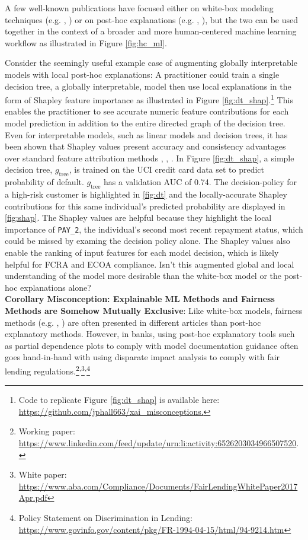 \documentclass[fleqn]{article}
\begin{document}
A few well-known publications have focused either on white-box modeling techniques (e.g. \cite{slim}, \cite{sbrl}) or on post-hoc explanations (e.g. \cite{lime}, \cite{shapley}), but the two can be used together in the context of a broader and more human-centered machine learning workflow as illustrated in Figure \ref{fig:hc_ml}. 

Consider the seemingly useful example case of augmenting globally interpretable models with local post-hoc explanations: A practitioner could train a single decision tree, a globally interpretable, model then use local explanations in the form of Shapley feature importance as illustrated in Figure \ref{fig:dt_shap}.\footnote{Code to replicate Figure \ref{fig:dt_shap} is available here: \url{https://github.com/jphall663/xai_misconceptions.}} This enables the practitioner to see accurate numeric feature contributions for each model prediction in addition to the entire directed graph of the decision tree. Even for interpretable models, such as linear models and decision trees, it has been shown that Shapley values present accuracy and consistency advantages over standard feature attribution methods \cite{lipovetsky2001analysis}, \cite{tree_shap}, \cite{shapley}. In Figure \ref{fig:dt_shap}, a simple decision tree, $g_{\text{tree}}$, is trained on the UCI credit card data set to predict probability of default. $g_{\text{tree}}$ has a validation AUC of 0.74. The decision-policy for a high-risk customer is highlighted in \ref{fig:dt} and the locally-accurate Shapley contributions for this same individual's predicted probability are displayed in \ref{fig:shap}. The Shapley values are helpful because they highlight the local importance of \texttt{PAY\_2}, the individual's second most recent repayment status, which could be missed by examing the decision policy alone. The Shapley values also enable the ranking of input features for each model decision, which is likely helpful for FCRA and ECOA compliance. Isn't this augmented global and local understanding of the model more desirable than the white-box model or the post-hoc explanations alone?\\ 

\textbf{Corollary Misconception: Explainable ML Methods and Fairness Methods are Somehow Mutually Exclusive}: Like white-box models, fairness methods (e.g. \cite{hardt2016equality}, \cite{feldman2015certifying}) are often presented in different articles than post-hoc explanatory methods. However, in banks, using post-hoc explanatory tools such as partial dependence plots to comply with model documentation guidance often goes hand-in-hand with using disparate impact analysis to comply with fair lending regulations.\footnote{Working paper: \url{https://www.linkedin.com/feed/update/urn:li:activity:6526203034966507520}.}\textsuperscript{,}\footnote{White paper: \url{https://www.aba.com/Compliance/Documents/FairLendingWhitePaper2017Apr.pdf}}\textsuperscript{,}\footnote{Policy Statement on Discrimination in Lending: \url{https://www.govinfo.gov/content/pkg/FR-1994-04-15/html/94-9214.htm}} 
\end{document}

